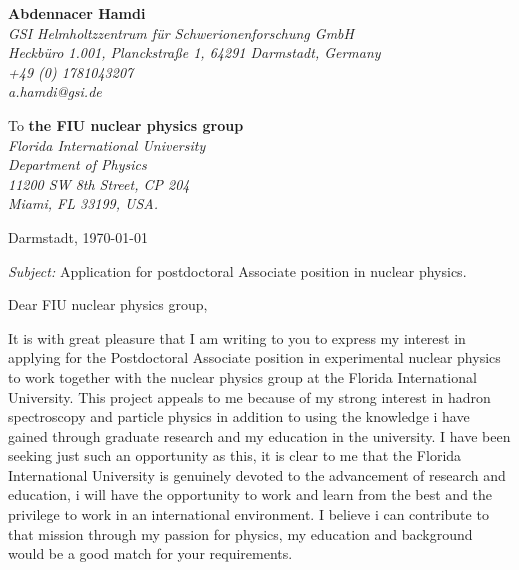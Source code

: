 \documentclass[11pt]{letter}
\begin{document}
 \sffamily
 \hfill
 \begin{flushleft}
 {\bfseries Abdennacer Hamdi}\\[.35ex]
 \small\itshape
 GSI Helmholtzzentrum f\"ur Schwerionenforschung GmbH\\
 Heckb\"uro 1.001, Planckstraße 1, 64291 Darmstadt, Germany\\[.35ex]
 +49 (0) 1781043207\\
 a.hamdi@gsi.de
 \end{flushleft}
 \begin{flushleft}
 To {\bfseries the FIU nuclear physics group}\\[.35ex]
 \small\itshape
 Florida International University \\
 Department of Physics \\
 11200 SW 8th Street, CP 204 \\
 Miami, FL 33199, USA.

 \end{flushleft}
 \hfill
 \begin{flushleft}
 Darmstadt, \today \\
 
 \end{flushleft}
\textit{Subject:} Application for postdoctoral Associate position in nuclear physics.\\
\par Dear FIU nuclear physics group,
~\par It is with great pleasure that I am writing to you to express my interest in applying for the Postdoctoral Associate position in experimental nuclear physics to work together with the nuclear physics group at the Florida International University. This project appeals to me because of my strong interest in hadron spectroscopy and particle physics in addition to using the knowledge i have gained through graduate research and my education in the university. I have been seeking just such an opportunity as this, it is clear to me that the Florida International University is genuinely devoted to the advancement of research and education, i will have the opportunity to work and learn from the best and the privilege to work in an international environment. I believe i can contribute to that mission through my passion for physics, my education and background would be a good match for your requirements.
\end{document}
